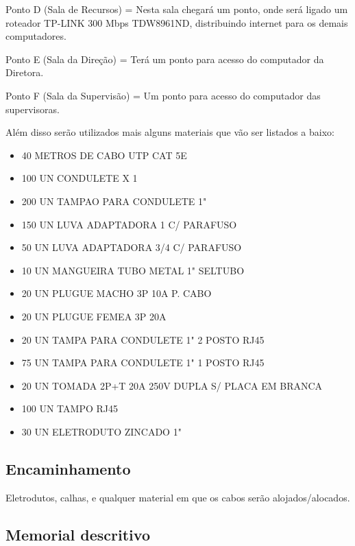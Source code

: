 \documentclass[	DIV=calc,%
							paper=a4,%
							fontsize=12pt,%
							onecolumn]{scrartcl}	 					%
\begin{document}
Ponto D (Sala de Recursos) = Nesta sala chegará um ponto, onde será ligado um roteador TP-LINK 300 Mbps TDW8961ND, distribuindo internet para os demais computadores.

Ponto E (Sala da Direção) = Terá um ponto para acesso do computador da Diretora.

Ponto F (Sala da Supervisão) = Um ponto para acesso do computador das supervisoras.

Além disso serão utilizados mais alguns materiais que vão ser listados a baixo:
\begin{itemize}
\item 40 METROS DE CABO UTP CAT 5E

\item 100 UN CONDULETE X 1

\item 200 UN TAMPAO PARA CONDULETE 1"

\item 150 UN LUVA ADAPTADORA 1 C/ PARAFUSO

\item 50 UN LUVA ADAPTADORA 3/4 C/ PARAFUSO

\item 10 UN MANGUEIRA TUBO METAL 1" SELTUBO

\item 20 UN PLUGUE MACHO 3P 10A P. CABO

\item 20 UN PLUGUE FEMEA 3P 20A

\item 20 UN TAMPA PARA CONDULETE 1" 2 POSTO RJ45

\item 75 UN TAMPA PARA CONDULETE 1" 1 POSTO RJ45

\item 20 UN TOMADA 2P+T 20A 250V DUPLA S/ PLACA EM BRANCA

\item 100 UN TAMPO RJ45

\item 30 UN ELETRODUTO ZINCADO 1"
\end{itemize}

\subsection{Encaminhamento}
Eletrodutos, calhas, e qualquer material em que os cabos serão alojados/alocados.

\subsection{Memorial descritivo}
\end{document}
